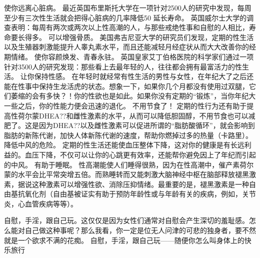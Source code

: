 \documentclass[12pt,UTF8]{ctexbook}
\begin{document}
使你远离心脏病。
最近英国布里斯托大学在一项针对2500人的研究中发现，每周至少有三次性生活就会把得心脏病的几率降低50%
延长寿命。
英国威尔士大学的调查表明：每周有两次或两次以上性高潮的人，与那些戒绝性事和自慰的人相比，寿命要长得多。
可以增强骨质。
美国弗吉尼亚大学的研究员们发现，定期的性生活以及生殖器刺激能提升人睾丸素水平，而且还能减轻月经症状从而大大改善你的经期情绪。
使你容颜焕发、青春永驻。
英国皇家艾丁伯格医院的科学家们通过一项针对3500人的研究发现：那些看上去最年轻的人，往往都会拥有最富活力的性生活。
让你保持性感。
在年轻时就经常有性生活的男性与女性，在年纪大了之后还能在性事中保持生龙活虎的状态。想象一下，如果你几个月都没有使用过双腿，它们萎缩的会有多快？！你的性欲也是如此。如果你没有定期的“锻炼”，当你年纪大一些之后，你的性能力便会迅速的退化。
不用节食了！
定期的性行为还有助于提高性荷尔蒙DHEA??和雌性激素的水平，从而可以降低胆固醇，不用节食也可以减肥了。这是因为DHEA??以及雌性激素可以促进所谓的“脂肪酸循环”，就会影响到脂肪的新陈代谢，加快人体新陈代谢的速度，帮助你燃掉过多的热量（卡路里）。
降低中风的危险。
定期的性生活还能使血压整体下降，这对你的健康是有长远利益的。血压下降，不仅可以让你的心跳更有效率，还能帮你避免因上了年纪而引起的中风。
有助于睡眠。
性高潮能使人们睡得很熟，因为在性高潮中，催产素荷尔蒙的水平会比平常突增五倍。而熟睡转而又能刺激大脑神经中枢在脑部释放褪黑激素，据说这种激素可以增强性欲、消除压抑情绪。最重要的是，褪黑激素是一种自由基抗氧化剂（自由基被证实有助于预防年龄性或与年龄有关的疾病，例如，关节炎，心血管疾病等等）。

自慰，手淫，跟自己玩。这仅仅是因为女性们通常对自慰会产生深切的羞耻感。怎么能对自己做这种事呢？那么我看，你一定是位无人问津的可悲的独身者，要不然就是一个欲求不满的花痴。
自慰，手淫，跟自己玩——随便你怎么叫身体上的快乐旅行
\end{document}
